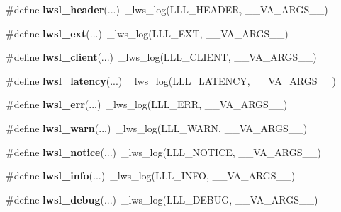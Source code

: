 \begin{DoxyCompactItemize}
\mbox{\label{group__log_gaab72aa186eff075fb3d229cb99a35434}} 
\#define {\bfseries lwsl\+\_\+header}(...)~\+\_\+lws\+\_\+log(L\+L\+L\+\_\+\+H\+E\+A\+D\+ER, \+\_\+\+\_\+\+V\+A\+\_\+\+A\+R\+G\+S\+\_\+\+\_\+)
\item 
\mbox{\label{group__log_ga8e0877b452d80bc154793ad81bfce742}} 
\#define {\bfseries lwsl\+\_\+ext}(...)~\+\_\+lws\+\_\+log(L\+L\+L\+\_\+\+E\+XT, \+\_\+\+\_\+\+V\+A\+\_\+\+A\+R\+G\+S\+\_\+\+\_\+)
\item 
\mbox{\label{group__log_ga181ea1ed9ba604e493ce092850d9da90}} 
\#define {\bfseries lwsl\+\_\+client}(...)~\+\_\+lws\+\_\+log(L\+L\+L\+\_\+\+C\+L\+I\+E\+NT, \+\_\+\+\_\+\+V\+A\+\_\+\+A\+R\+G\+S\+\_\+\+\_\+)
\item 
\mbox{\label{group__log_gab5842ee4ec5f763d057869e083ff1cb0}} 
\#define {\bfseries lwsl\+\_\+latency}(...)~\+\_\+lws\+\_\+log(L\+L\+L\+\_\+\+L\+A\+T\+E\+N\+CY, \+\_\+\+\_\+\+V\+A\+\_\+\+A\+R\+G\+S\+\_\+\+\_\+)
\item 
\mbox{\label{group__log_gad44c15d00076052a398244035a7dbb56}} 
\#define {\bfseries lwsl\+\_\+err}(...)~\+\_\+lws\+\_\+log(L\+L\+L\+\_\+\+E\+RR, \+\_\+\+\_\+\+V\+A\+\_\+\+A\+R\+G\+S\+\_\+\+\_\+)
\item 
\mbox{\label{group__log_ga1bcd293826c0a91d6e7ac3c54db72885}} 
\#define {\bfseries lwsl\+\_\+warn}(...)~\+\_\+lws\+\_\+log(L\+L\+L\+\_\+\+W\+A\+RN, \+\_\+\+\_\+\+V\+A\+\_\+\+A\+R\+G\+S\+\_\+\+\_\+)
\item 
\mbox{\label{group__log_ga86b3c56c638569eb93919c52a1d5dfaf}} 
\#define {\bfseries lwsl\+\_\+notice}(...)~\+\_\+lws\+\_\+log(L\+L\+L\+\_\+\+N\+O\+T\+I\+CE, \+\_\+\+\_\+\+V\+A\+\_\+\+A\+R\+G\+S\+\_\+\+\_\+)
\item 
\mbox{\label{group__log_gaf13957a4d9fb47c070b9320303c32502}} 
\#define {\bfseries lwsl\+\_\+info}(...)~\+\_\+lws\+\_\+log(L\+L\+L\+\_\+\+I\+N\+FO, \+\_\+\+\_\+\+V\+A\+\_\+\+A\+R\+G\+S\+\_\+\+\_\+)
\item 
\mbox{\label{group__log_ga74a1a3d4d96b146a0ac45faab0028ade}} 
\#define {\bfseries lwsl\+\_\+debug}(...)~\+\_\+lws\+\_\+log(L\+L\+L\+\_\+\+D\+E\+B\+UG, \+\_\+\+\_\+\+V\+A\+\_\+\+A\+R\+G\+S\+\_\+\+\_\+)

\end{DoxyCompactItemize}
